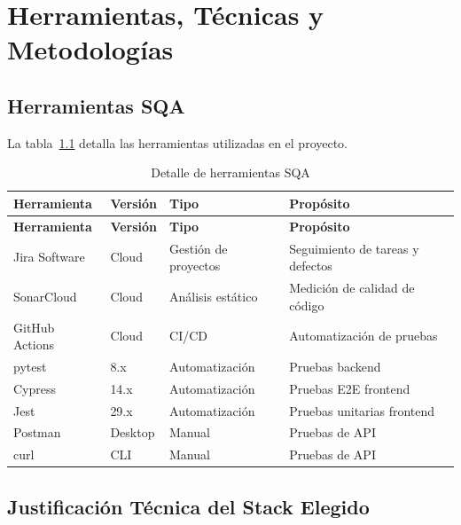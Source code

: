 \chapter{Herramientas, Técnicas y Metodologías}
\label{sec:herramientas}

\section{Herramientas SQA}
\label{sec:herramientas-sqa}

La tabla~\ref{tab:herramientas-detalle} detalla las herramientas utilizadas en el proyecto.

\begin{longtable}{lp{3cm}p{5cm}p{3cm}}
\caption{Detalle de herramientas SQA}
\label{tab:herramientas-detalle}\\
\toprule
\textbf{Herramienta} & \textbf{Versión} & \textbf{Tipo} & \textbf{Propósito}\\
\midrule
\endfirsthead
\toprule
\textbf{Herramienta} & \textbf{Versión} & \textbf{Tipo} & \textbf{Propósito}\\
\midrule
\endhead
\bottomrule
\endfoot

Jira Software & Cloud & Gestión de proyectos & Seguimiento de tareas y defectos\\

SonarCloud & Cloud & Análisis estático & Medición de calidad de código\\

GitHub Actions & Cloud & CI/CD & Automatización de pruebas\\

pytest & 8.x & Automatización & Pruebas backend\\

Cypress & 14.x & Automatización & Pruebas E2E frontend\\

Jest & 29.x & Automatización & Pruebas unitarias frontend\\

Postman & Desktop & Manual & Pruebas de API\\

curl & CLI & Manual & Pruebas de API\\

\end{longtable}

\section{Justificación Técnica del Stack Elegido}
\label{sec:justificacion-stack}


